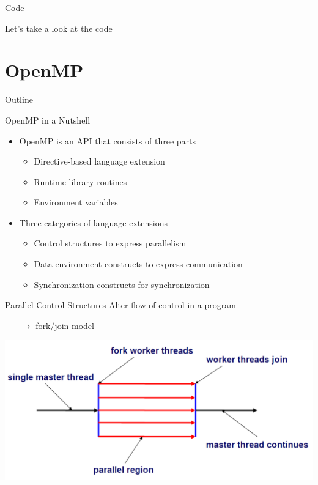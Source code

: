 \begin{frame}{Code}
  \begin{center}
    {\huge Let's take a look at the code}
  \end{center}
\end{frame}


\section{OpenMP}

\begin{frame}{Outline}
  \tableofcontents[current]
\end{frame}

\begin{frame}{OpenMP in a Nutshell}
  \begin{itemize}
  \item OpenMP is an API that consists of three parts
    \begin{itemize}
    \item Directive-based language extension
    \item Runtime library routines
    \item Environment variables
    \end{itemize}
  \item Three categories of language extensions
    \begin{itemize}
    \item Control structures to express \alert{parallelism}
    \item Data environment constructs to express \alert{communication}
    \item Synchronization constructs for \alert{synchronization}
    \end{itemize}
  \end{itemize}
\end{frame}

\begin{frame}{Parallel Control Structures}
  Alter flow of control in a program

  \begin{itemize}
  \item[$\rightarrow$] fork/join model
  \end{itemize}


  \begin{center}
    \includegraphics[width=\textwidth]{figures/openmp}
  \end{center}
\end{frame}

